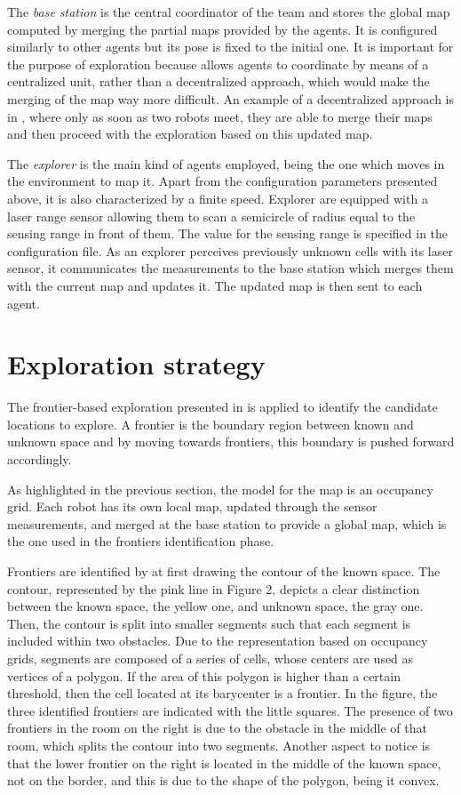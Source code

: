 The \emph{base station} is the central coordinator of the team and
stores the global map computed by merging the partial maps provided
by the agents. It is configured similarly to other agents but its
pose is fixed to the initial one. It is important for the purpose
of exploration because allows agents to coordinate by means of a centralized
unit, rather than a decentralized approach, which would make the merging
of the map way more difficult. An example of a decentralized approach
is in \cite{Benedettelli2012}, where only as soon as two robots meet, they are
able to merge their maps and then proceed with the exploration based
on this updated map.

The \emph{explorer }is the main kind of agents employed, being the
one which moves in the environment to map it. Apart from the configuration
parameters presented above, it is also characterized by a finite speed.
Explorer are equipped with a laser range sensor allowing them to scan
a semicircle of radius equal to the sensing range in front of them.
The value for the sensing range is specified in the configuration
file. As an explorer perceives previously unknown cells with its laser
sensor, it communicates the measurements to the base station which
merges them with the current map and updates it. The updated map is
then sent to each agent. 

\section{Exploration strategy}

The frontier-based exploration presented in \cite{Yamauchi1998} is applied
to identify the candidate locations to explore. A frontier is the
boundary region between known and unknown space and by moving towards
frontiers, this boundary is pushed forward accordingly.

As highlighted in the previous section, the model for the map is an
occupancy grid. Each robot has its own local map, updated through
the sensor measurements, and merged at the base station to provide
a global map, which is the one used in the frontiers identification
phase.

Frontiers are identified by at first drawing the contour of the known
space. The contour, represented by the pink line in Figure 2, depicts
a clear distinction between the known space, the yellow one, and unknown
space, the gray one. Then, the contour is split into smaller segments
such that each segment is included within two obstacles. Due to the
representation based on occupancy grids, segments are composed of
a series of cells, whose centers are used as vertices of a polygon.
If the area of this polygon is higher than a certain threshold, then
the cell located at its barycenter is a frontier. In the figure, the
three identified frontiers are indicated with the little squares.
The presence of two frontiers in the room on the right is due to the
obstacle in the middle of that room, which splits the contour into
two segments. Another aspect to notice is that the lower frontier
on the right is located in the middle of the known space, not on the
border, and this is due to the shape of the polygon, being it convex. 


